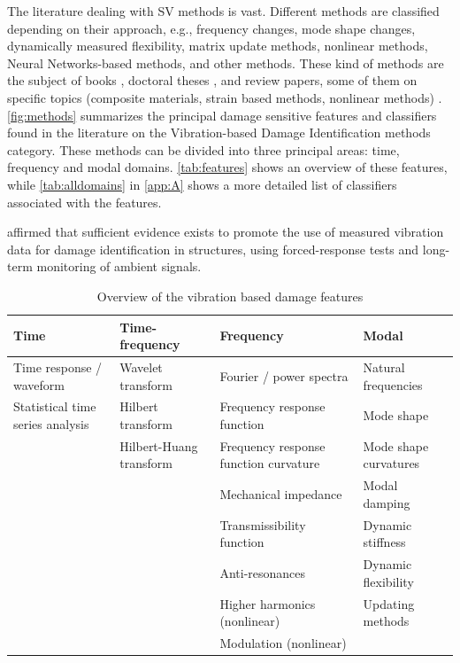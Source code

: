 The literature dealing with SV methods is vast. Different methods are classified depending on their approach, e.g., frequency changes, mode shape changes, dynamically measured flexibility, matrix update methods, nonlinear methods, Neural Networks-based methods, and other methods. These kind of methods are the subject of books \cite{Balageas2006,Boller2009}, doctoral theses \cite{Ooijevaar2014,de2016shm}, and review papers, some of them on specific topics (composite materials, strain based methods, nonlinear methods) \cite{Doebling1996,Doebling1998,Zou2000,Sohn2004,Carden2004,Montalvao2006,Fassois2007,Worden2008,Jhang2009,Fritzen2009,Li2010,Fan2011}. \autoref{fig:methods} summarizes the principal damage sensitive features and classifiers found in the literature on the Vibration-based Damage Identification methods category. These methods can be divided into three principal areas: time, frequency and modal domains. \autoref{tab:features} shows an overview of these features, while \autoref{tab:alldomains} in \autoref{app:A} shows a more detailed list of classifiers associated with the features.

 affirmed that sufficient evidence exists to promote the use of measured vibration data for damage identification in structures, using forced-response tests and long-term monitoring of ambient signals.

\begin{table}[H]
    \caption{Overview of the vibration based damage features}
    \label{tab:features}
    \centering
    \scriptsize
    \begin{tabular}{L{0.2\textwidth}L{0.2\textwidth}L{0.2\textwidth}L{0.2\textwidth}}
        \toprule
         Time & Time-frequency & Frequency & Modal \\
         \midrule
         Time response / waveform & Wavelet transform & Fourier / power spectra & Natural frequencies \\
         Statistical time series analysis & Hilbert transform & Frequency response function & Mode shape \\
         & Hilbert-Huang transform & Frequency response function curvature & Mode shape curvatures \\
         & & Mechanical impedance & Modal damping \\
         & & Transmissibility function & Dynamic stiffness \\
         & & Anti-resonances & Dynamic flexibility \\
         & & Higher harmonics (nonlinear) & Updating methods \\
         & & Modulation (nonlinear)\\
         \bottomrule
    \end{tabular}
\end{table}

